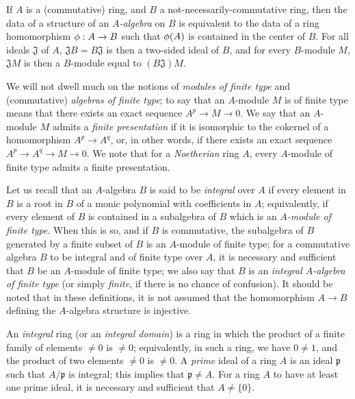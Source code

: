 \begin{env}[1.0.4]
\label{0.1.0.4}
If $A$ is a (commutative) ring, and $B$ a not-necessarily-commutative ring, then the data of a structure of an \emph{$A$-algebra} on $B$ is equivalent to the data of a ring homomorphism $\vphi:A\to B$ such that $\phi(A)$ is contained in the center of $B$.
For all ideals $\mathfrak{J}$ of $A$, $\mathfrak{J}B=B\mathfrak{J}$ is then a two-sided ideal of $B$, and for every $B$-module $M$, $\mathfrak{J}M$ is then a $B$-module equal to $(B\mathfrak{J})M$.
\end{env}

\begin{env}[1.0.5]
\label{0.1.0.5}
We will not dwell much on the notions of \emph{modules of finite type} and
(commutative) \emph{algebras of finite type};
to say that an $A$-module $M$ is of finite type means that there exists
an exact sequence $A^p\to M\to 0$.
We say that an $A$-module $M$ admits a \emph{finite presentation} if it is isomorphic to the cokernel of a homomorphism $A^p\to A^q$, or, in other words, if there exists an exact sequence $A^p\to A^q\to M\to 0$.
We note that for a \emph{Noetherian} ring $A$, every $A$-module of finite type admits a finite presentation.

Let us recall that an $A$-algebra $B$ is said to be \emph{integral} over $A$ if every element in $B$ is a root in $B$ of a monic polynomial with coefficients in $A$;
equivalently, if every element of $B$ is contained in a subalgebra of $B$ which is an \emph{$A$-module of finite type}.
When this is so, and if $B$ is commutative, the subalgebra of $B$ generated by a finite subset of $B$ is an $A$-module of finite type;
for a commutative algebra $B$ to be integral and of finite type over $A$, it is necessary and sufficient that $B$ be an $A$-module of finite type;
we also say that $B$ is an \emph{integral $A$-algebra of finite type} (or simply \emph{finite}, if there is no chance of confusion).
It should be noted that in these definitions, it is not assumed that the homomorphism $A\to B$ defining the $A$-algebra structure is injective.
\end{env}

\begin{env}[1.0.6]
\label{0.1.0.6}
An \emph{integral} ring (or an \emph{integral domain}) is a ring in which the product of a finite family of elements $\neq 0$ is $\neq 0$;
equivalently, in such a ring, we have $0\neq 1$, and the product of two elements $\neq 0$ is $\neq0$.
A \emph{prime} ideal of a ring $A$ is an ideal $\mathfrak{p}$ such that $A/\mathfrak{p}$ is integral;
this implies that $\mathfrak{p}\neq A$.
For a ring $A$ to have at least one prime ideal, it is necessary and sufficient that $A\neq\{0\}$.
\end{env}

